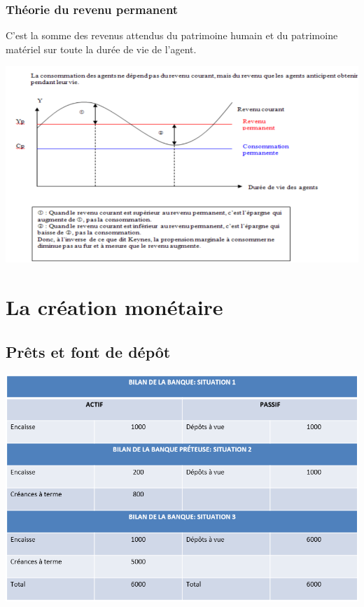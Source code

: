\subsubsection{Théorie du revenu permanent}
C'est la somme des revenus attendus du patrimoine humain et du patrimoine matériel sur toute la durée de vie de l'agent.
\begin{center}
    \includegraphics[scale=0.5]{Pics/Theorie_revenu_permanent.png}
\end{center}
\section{La création monétaire}
\subsection{Prêts et font de dépôt}
\begin{center}
    \includegraphics[scale=0.75]{Pics/Pret_et_fond_de_depot.png}
\end{center}
